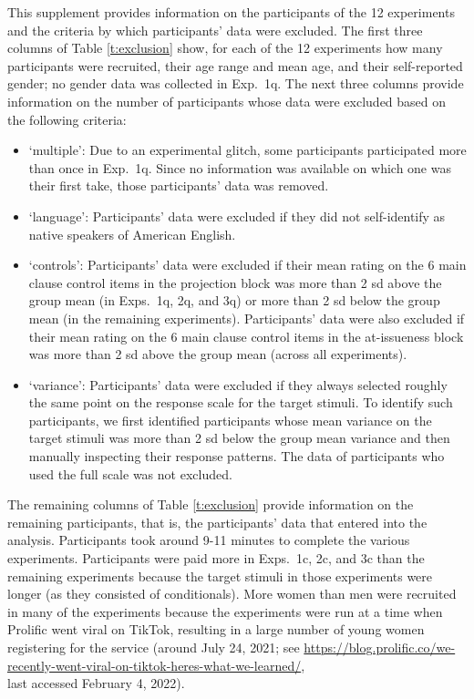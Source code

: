 \documentclass[11pt,fleqn]{article}
\newcommand{\6}{\mbox{$[\hspace*{-.6mm}[$}}
\newcommand{\9}{\mbox{$]\hspace*{-.6mm}]$}}
\begin{document}
This supplement provides information on the participants of the 12 experiments and the criteria by which participants' data were excluded. The first three columns of Table \ref{t:exclusion} show, for each of the 12 experiments how many participants were recruited, their age range and mean age, and their self-reported gender; no gender data was collected in Exp.~1q. The next three columns provide information on the number of participants whose data were excluded based on the following criteria:

\begin{itemize}[itemsep=-2pt]

\item `multiple': Due to an experimental glitch, some participants participated more than once in Exp.~1q. Since no information was available on which one was their first take, those participants' data was removed. 

\item `language': Participants' data were excluded if they did not self-identify as native speakers of American English.

\item `controls': Participants' data were excluded if their mean rating on the 6 main clause control items in the projection block was more than 2 sd above the group mean (in Exps.~1q, 2q, and 3q) or more than 2 sd below the group mean (in the remaining experiments). Participants' data were also excluded if their mean rating on the 6 main clause control items in the at-issueness block was more than 2 sd above the group mean (across all experiments).
 
\item `variance': Participants' data were excluded if they always selected roughly the same point on the response scale for the target stimuli. To identify such participants, we first identified participants whose mean variance on the target stimuli was more than 2 sd below the group mean variance and then manually inspecting their response patterns. The data of participants who used the full scale was not excluded.  
\end{itemize}

The remaining columns of Table \ref{t:exclusion} provide information on the remaining participants, that is, the participants' data that entered into the analysis. Participants took around 9-11 minutes to complete the various experiments. Participants were paid more in Exps.~1c, 2c, and 3c than the remaining experiments because the target stimuli in those experiments were longer (as they consisted of conditionals). More women than men were recruited in many of the experiments because the experiments were run at a time when Prolific went viral on TikTok, resulting in a large number of young women registering for the service (around July 24, 2021; see \url{https://blog.prolific.co/we-recently-went-viral-on-tiktok-heres-what-we-learned/}, \\ last accessed February 4, 2022).  
\end{document}
